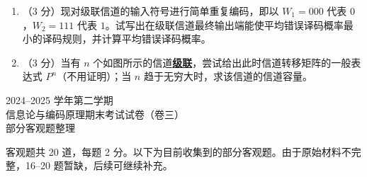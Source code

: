 \documentclass[UTF8,a4paper,12pt]{ctexart}
\begin{document}
\begin{enumerate}[label=\arabic*., leftmargin=2em, start=3]

\item （3 分）现对级联信道的输入符号进行简单重复编码，即以
$W_1=000$ 代表 $0$，$W_2=111$ 代表 $1$。试写出在级联信道最终输出端能使平均错误译码概率最小的译码规则，并计算平均错误译码概率。

\item （3 分）当有 $n$ 个如图所示的信道\underline{\textbf{级联}}，尝试给出此时信道转移矩阵的一般表达式 $P^n$（不用证明）；当 $n$ 趋于无穷大时，求该信道的信道容量。

\end{enumerate}

\newpage

\newpage

\begin{center}
    {\heiti{} 2024--2025 学年第二学期}\\[0.5em]
    {\heiti{} 信息论与编码原理期末考试试卷（卷三）}\\[0.5em]
    {\heiti{} 部分客观题整理}
\end{center}

\vspace{1em}

\noindent
客观题共 20 道，每题 2 分。以下为目前收集到的部分客观题。由于原始材料不完整，16--20 题暂缺，后续可继续补充。

\vspace{1em}
\end{document}
